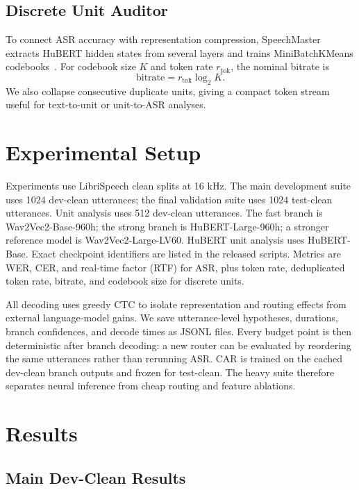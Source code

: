 \documentclass{article}
\begin{document}
\subsection{Discrete Unit Auditor}

To connect ASR accuracy with representation compression, SpeechMaster extracts
HuBERT hidden states from several layers and trains MiniBatchKMeans
codebooks~\cite{minibatchkmeans}.
For codebook size $K$ and token rate $r_{\mathrm{tok}}$, the nominal bitrate is
\begin{equation}
    \mathrm{bitrate}=r_{\mathrm{tok}}\log_2K.
\end{equation}
We also collapse consecutive duplicate units, giving a compact token stream
useful for text-to-unit or unit-to-ASR analyses.

\section{Experimental Setup}

Experiments use LibriSpeech clean splits at 16 kHz. The main development suite
uses 1024 dev-clean utterances; the final validation suite uses 1024 test-clean
utterances. Unit analysis uses 512 dev-clean utterances. The fast branch is
Wav2Vec2-Base-960h; the strong branch is HuBERT-Large-960h; a stronger
reference model is Wav2Vec2-Large-LV60. HuBERT unit analysis uses HuBERT-Base.
Exact checkpoint identifiers are listed in the released scripts. Metrics are
WER, CER, and real-time factor (RTF) for ASR, plus token rate, deduplicated
token rate, bitrate, and codebook size for discrete units.

All decoding uses greedy CTC to isolate representation and routing effects from
external language-model gains. We save utterance-level hypotheses, durations,
branch confidences, and decode times as JSONL files. Every budget point is then
deterministic after branch decoding: a new router can be evaluated by reordering
the same utterances rather than rerunning ASR. CAR is trained on the cached
dev-clean branch outputs and frozen for test-clean. The heavy suite therefore
separates neural inference from cheap routing and feature ablations.

\section{Results}

\subsection{Main Dev-Clean Results}
\end{document}
